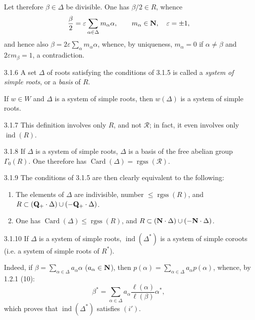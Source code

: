 Let therefore $\beta\in\Delta$ be divisible. One has $\beta/2\in R$, whence
\[
\frac\beta2=\varepsilon\sum_{\alpha\in\Delta}m_\alpha\alpha,\qquad m_\alpha\in\mathbf{N},\quad\varepsilon=\pm1,
\]
and hence also $\beta=2\varepsilon\sum_\alpha m_\alpha\alpha$, whence, by uniqueness, $m_\alpha=0$ if $\alpha\ne\beta$ and $2\varepsilon m_\beta=1$, a contradiction.

\begin{definition}{3.1.6}\label{XXI.3.1.6}
A set $\Delta$ of roots satisfying the conditions of 3.1.5 is called a \emph{system of simple roots}, or a \emph{basis} of $R$.
\end{definition}
If $w\in W$ and $\Delta$ is a system of simple roots, then $w(\Delta)$ is a system of simple roots.
\begin{remark}{3.1.7}\label{XXI.3.1.7}
This definition involves only $R$, and not $\mathcal R$; in fact, it even involves only $\operatorname{ind}(R)$.
\end{remark}
\begin{remark}{3.1.8}\label{XXI.3.1.8}
If $\Delta$ is a system of simple roots, $\Delta$ is a basis of the free abelian group $\Gamma_0(R)$. One therefore has $\operatorname{Card}(\Delta)=\operatorname{rgss}(\mathcal R)$.
\end{remark}
\begin{remark}{3.1.9}\label{XXI.3.1.9}
The conditions of 3.1.5 are then clearly equivalent to the following:
\begin{enumerate}[label=\textup{(\roman*')}]
\item The elements of $\Delta$ are indivisible, number $\leq\operatorname{rgss}(R)$, and $R\subset(\mathbf{Q}_+\cdot\Delta)\cup(-\mathbf{Q}_+\cdot\Delta)$.
\item One has $\operatorname{Card}(\Delta)\leq\operatorname{rgss}(R)$, and $R\subset(\mathbf{N}\cdot\Delta)\cup(-\mathbf{N}\cdot\Delta)$.
\end{enumerate}
\end{remark}

\begin{corollary}{3.1.10}\label{XXI.3.1.10}
If $\Delta$ is a system of simple roots, $\operatorname{ind}(\Delta^*)$ is a system of simple coroots (i.e. a system of simple roots of $R^*$).
\end{corollary}
Indeed, if $\beta=\sum_{\alpha\in\Delta}a_\alpha\alpha$ ($a_\alpha\in\mathbf{N}$), then $p(\alpha)=\sum_{\alpha\in\Delta}a_\alpha p(\alpha)$, whence, by 1.2.1 (10):
\[
\beta^*=\sum_{\alpha\in\Delta}a_\alpha\frac{\ell(\alpha)}{\ell(\beta)}\alpha^*,
\]
which proves that $\operatorname{ind}(\Delta^*)$ satisfies $(i')$.

